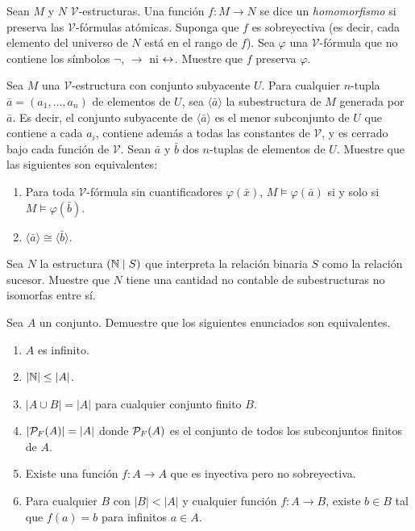 \documentclass[12pt,a4paper]{book}
\newcommand{\VV}{\mathcal{V}}
\begin{document}
    \begin{ejercicio}
        Sean $M$ y $N$ $\VV$-estructuras. Una función $f:M\rightarrow N$ se dice un \textit{homomorfismo} si preserva las
        $\VV$-fórmulas atómicas. Suponga que $f$ es sobreyectiva (es decir, cada elemento del universo de $N$ está en el
        rango de $f$). Sea $\varphi$ una $\VV$-fórmula que no contiene los símbolos $\neg$, $\rightarrow$ ni $\leftrightarrow$.
        Muestre que $f$ preserva $\varphi$.
    \end{ejercicio}

    \begin{ejercicio}
        Sea $M$ una $\VV$-estructura con conjunto subyacente $U$. Para cualquier $n$-tupla $\bar{a}=(a_{1},\dots,a_{n})$
        de elementos de $U$, sea $\langle\bar{a}\rangle$ la subestructura de $M$ generada por $\bar{a}$. Es decir, el
        conjunto subyacente de $\langle\bar{a}\rangle$ es el menor subconjunto de $U$ que contiene a cada $a_{i}$, contiene
        además a todas las constantes de $\VV$, y es cerrado bajo cada función de $\VV$. Sean $\bar{a}$ y $\bar{b}$ dos
        $n$-tuplas de elementos de $U$. Muestre que las siguientes son equivalentes:
        \begin{enumerate}
            \item[(i)] Para toda $\VV$-fórmula sin cuantificadores $\varphi(\bar{x})$, $M\models\varphi(\bar{a})$ si y
            solo si $M\models\varphi(\bar{b})$.
            \item[(ii)] $\langle\bar{a}\rangle\cong\langle\bar{b}\rangle$.
        \end{enumerate}
    \end{ejercicio}

    \begin{ejercicio}
        Sea $N$ la estructura $(\mathbb{N}\mid S)$ que interpreta la relación binaria $S$ como la relación sucesor. Muestre que
        $N$ tiene una cantidad no contable de subestructuras no isomorfas entre sí.
    \end{ejercicio}

    \begin{ejercicio}
        Sea $A$ un conjunto. Demuestre que los siguientes enunciados son equivalentes.
        \begin{enumerate}
            \item[(i)] $A$ es infinito.
            \item[(ii)] $|\mathbb{N}|\leq|A|$.
            \item[(iii)] $|A\cup B|=|A|$ para cualquier conjunto finito $B$.
            \item[(iv)] $|\mathcal{P}_{F}(A)|=|A|$ donde $\mathcal{P}_{F}(A)$ es el conjunto de todos los subconjuntos finitos de $A$.
            \item[(v)] Existe una función $f:A\rightarrow A$ que es inyectiva pero no sobreyectiva.
            \item[(vi)] Para cualquier $B$ con $|B|<|A|$ y cualquier función $f:A\rightarrow B$, existe $b\in B$ tal que
            $f(a)=b$ para infinitos $a\in A$.
        \end{enumerate}
    \end{ejercicio}
\end{document}

